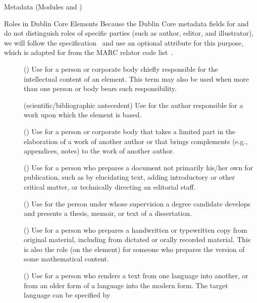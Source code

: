 \begin{tchapter}[id=metadata,short=Metadata]{Metadata (Modules {} and  {})}
\begin{tsection}[id=dc-roles]{Roles in Dublin Core Elements}
Because the Dublin Core metadata fields for {} and
{} do not distinguish roles of specific parties (such as
author, editor, and illustrator), we will follow the {}
specification~\cite{OpenEBook:oeps99} and use an optional
{} attribute for this purpose, which is
adapted for {\omdoc} from the MARC relator code list~\cite{Marc:relators03}.
\begin{description}
\item[{}] ({}) Use for a
  person or corporate body chiefly responsible for the intellectual
  content of an element. This term may also be used when more than one person or body
  bears such responsibility.
\item[{}] (scientific/bibliographic
  antecedent) Use
for the author responsible for a work upon which the element is based.
\item[{}] ({}) Use
  for a person or corporate body that takes a limited part in the elaboration of a
  work of another author or that brings complements (e.g., appendices, notes) to
  the work of another author.
\item[{}] ({}) Use for a
  person who prepares a document not primarily his/her own for publication, such
  as by elucidating text, adding introductory or other critical matter, or
  technically directing an editorial staff.
\item[{}] ({}) Use for the person under
  whose supervision a degree candidate develops and presents a thesis, memoir, or text of
  a dissertation.
\item[{}] ({}) Use
  for a person who prepares a handwritten or typewritten copy from original
  material, including from dictated or orally recorded material. This is also the
  role (on the {} element) for someone who prepares the {\omdoc}
  version of some mathematical content.
\item[{}] ({}) Use
  for a person who renders a text from one language into another, or from an older
  form of a language into the modern form. The target language can be specified by

\end{description}
\end{tsection}
\end{tchapter}
